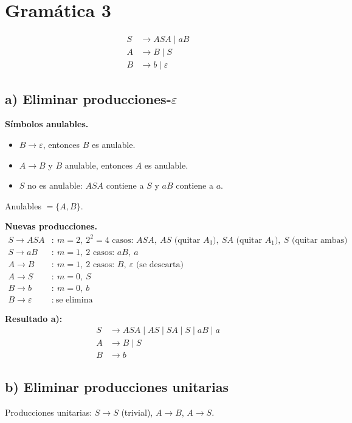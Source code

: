 \documentclass[11pt]{article}
\newcommand{\eps}{\varepsilon}
\begin{document}
\newpage
\section*{Gram\'atica 3}
\begin{align*}
S &\to ASA \mid aB\\
A &\to B \mid S\\
B &\to b \mid \eps
\end{align*}

\subsection*{a) Eliminar producciones-$\eps$}

\textbf{S\'imbolos anulables.}
\begin{itemize}[nosep]
  \item $B \to \eps$, entonces $B$ es anulable.
  \item $A \to B$ y $B$ anulable, entonces $A$ es anulable.
  \item $S$ no es anulable: $ASA$ contiene a $S$ y $aB$ contiene a $a$.
\end{itemize}
Anulables $=\{A,B\}$.

\textbf{Nuevas producciones.}
\begin{align*}
S \to ASA &:\ m=2,\ 2^2=4 \text{ casos: } ASA,\ AS \text{ (quitar } A_3),\ SA \text{ (quitar } A_1),\ S \text{ (quitar ambas)}\\
S \to aB  &:\ m=1,\ 2 \text{ casos: } aB,\ a\\
A \to B   &:\ m=1,\ 2 \text{ casos: } B,\ \eps \text{ (se descarta)}\\
A \to S   &:\ m=0,\ S\\
B \to b   &:\ m=0,\ b\\
B \to \eps &:\ \text{se elimina}
\end{align*}

\textbf{Resultado a):}
\begin{align*}
S &\to ASA \mid AS \mid SA \mid S \mid aB \mid a\\
A &\to B \mid S\\
B &\to b
\end{align*}

\subsection*{b) Eliminar producciones unitarias}

Producciones unitarias: $S \to S$ (trivial), $A \to B$, $A \to S$.
\end{document}
